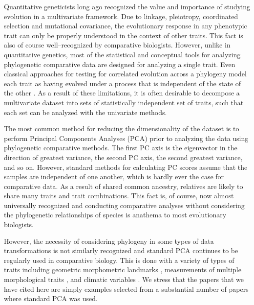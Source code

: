 \documentclass[a4paper,11pt]{article}
\begin{document}
\newpage

\noindent Quantitative geneticists long ago recognized the value and importance of studying evolution in a multivariate framework. Due to linkage, pleiotropy, coordinated selection and mutational covariance, the evolutionary response in any phenotypic trait can only be properly understood in the context of other traits. This fact is also of course well--recognized by comparative biologists. However, unlike in quantitative genetics, most of the statistical and conceptual tools for analyzing phylogenetic comparative data \citep[recently reviewed in][]{PennellHarmon} are designed for analyzing a single trait. Even classical approaches for testing for correlated evolution across a phylogeny \citep[e.g.,][]{Felsenstein1985, Grafen1989, HarveyPagel1991} model each trait as having evolved under a process that is independent of the state of the other \citep{HansenOrzack2005}. As a result of these limitations, it is often desirable to decompose a multivariate dataset into sets of statistically independent set of traits, such that each set can be analyzed with the univariate methods.

The most common method for reducing the dimensionality of the dataset is to perform Principal Components Analyses (PCA) prior to analyzing the data using phylogenetic comparative methods. The first PC axis is the eigenvector in the direction of greatest variance, the second PC axis, the second greatest variance, and so on. However, standard methods for calculating PC scores assume that the samples are independent of one another, which is hardly ever the case for comparative data. As a result of shared common ancestry, relatives are likely to share many traits and trait combinations. This fact is, of course, now almost universally recognized and conducting comparative analyses without considering the phylogenetic relationships of species is anathema to most evolutionary biologists.

However, the necessity of considering phylogeny in some types of data transformations \citep{Revell2008} is not similarly recognized and standard PCA continues to be regularly used in comparative biology. This is done with a variety of types of traits including geometric morphometric landmarks \citep[e.g.,][]{Dornburg2011, Hunt2013}, measurements of multiple morphological traits \citep[e.g.,][]{Harmon2010, BergmannIrshick2012, Weir2012, Pienaar2013, Price2014}, and climatic variables \citep[e.g.,][]{KozakWiens2010, Schnitzler2012}. We stress that the papers that we have cited here are simply examples selected from a substantial number of papers where standard PCA was used.
\end{document}
